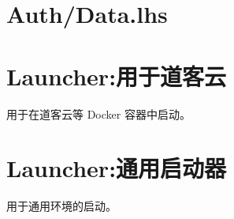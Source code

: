   \section[辅助Auth.lhs]{Auth/Data.lhs}
  

  \section{Launcher:用于道客云}
  用于在道客云等 Docker 容器中启动。
  
  
  \section{Launcher:通用启动器}
  用于通用环境的启动。
  
  


